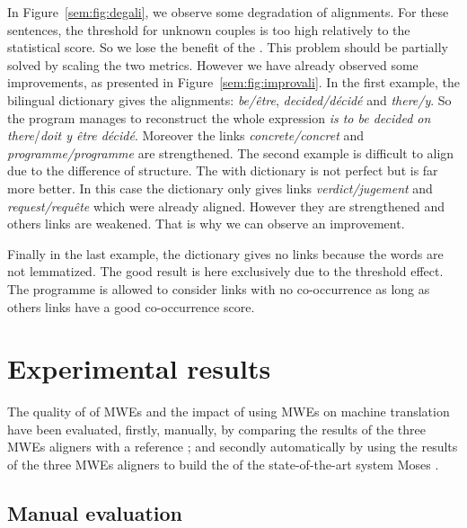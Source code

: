 \documentclass[output=paper,modfonts,nonflat]{langsci/langscibook}
\begin{document}
In Figure~\ref{sem:fig:degali}, we observe some degradation of alignments.
For these sentences, the threshold for unknown couples is too high relatively to the statistical score. 
So we lose the benefit of the . 
This problem should be partially solved by scaling the two metrics. However we have already observed some improvements, as presented in Figure~\ref{sem:fig:improvali}. In the first example, the bilingual dictionary gives the alignments: \textit{be\slash être}, \textit{decided\slash décidé} and \textit{there\slash y}. So the program manages to reconstruct the whole expression \textit{is to be decided on there}\slash\textit{doit y être décidé}. Moreover the links \textit{concrete\slash concret} and \textit{programme\slash programme} are strengthened. The second example is difficult to align due to the difference of structure. The  with dictionary is not perfect but is far more better. In this case the dictionary only gives links \textit{verdict\slash jugement} and \textit{request\slash requête} which were already aligned. However they are strengthened and others links are weakened. That is why we can observe an improvement.

Finally in the last example, the dictionary gives no links because the words are not lemmatized. The good result is here exclusively due to the threshold effect. The programme is allowed to consider links with no co-occurrence as long as others links have a good co-occurrence score.


\section{Experimental results}\label{sec:semmar:5}
The quality of  of MWEs and the impact of using MWEs on machine translation have been evaluated, firstly, manually, by comparing the results of the three MWEs aligners with a reference ;
and secondly automatically by using the results of the three MWEs aligners to build the  of the state-of-the-art  system Moses \citep{koehn2007moses}.


\subsection{Manual evaluation}\label{sec:semmar:5.1}
\end{document}
